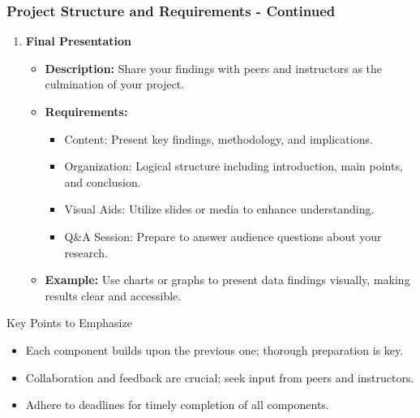 \documentclass[aspectratio=169]{beamer}
\begin{document}
\begin{frame}[fragile]
    \frametitle{Project Structure and Requirements - Continued}
    \begin{enumerate}[resume]
        \item \textbf{Final Presentation}
        \begin{itemize}
            \item \textbf{Description:} Share your findings with peers and instructors as the culmination of your project.
            \item \textbf{Requirements:}
            \begin{itemize}
                \item Content: Present key findings, methodology, and implications.
                \item Organization: Logical structure including introduction, main points, and conclusion.
                \item Visual Aids: Utilize slides or media to enhance understanding.
                \item Q\&A Session: Prepare to answer audience questions about your research.
            \end{itemize}
            \item \textbf{Example:} Use charts or graphs to present data findings visually, making results clear and accessible.
        \end{itemize}
    \end{enumerate}
    
    \begin{block}{Key Points to Emphasize}
        \begin{itemize}
            \item Each component builds upon the previous one; thorough preparation is key.
            \item Collaboration and feedback are crucial; seek input from peers and instructors.
            \item Adhere to deadlines for timely completion of all components.
        \end{itemize}
    \end{block}
\end{frame}
\end{document}
